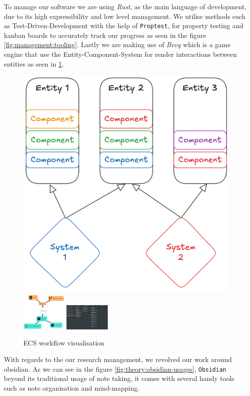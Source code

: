 To manage our software we are using \textit{Rust},
as the main language of development, due to its high expressibility and low level management.
We utilise methods such as Test-Driven-Development with the help of \texttt{Proptest},
for property testing and kanban boards to accurately track our progress as seen
in the figure \ref{fig:management:tooling}. Lastly we are making use of 
\textit{Bevy} which is a game engine that use the Entity-Component-System
for render interactions between entities as seen in \ref{fig:soft:ecs-workflow}.


\begin{figure}[h!]
    \centering
    \includegraphics[width=0.2\linewidth]{assets/ECS-visualisatoin.png}
    \includegraphics[width=0.2\textwidth]{assets/research-visualisation.png}
    \includegraphics[width=0.2\textwidth]{assets/kanban-board.png}
    \caption{ECS workflow visualisation}
    \label{fig:soft:ecs-workflow}
\end{figure}

With regards to the our research management, we revolved our work around obsidian. As we can see in the figure \ref{fig:theory:obsidian-usages}, 
\texttt{Obsidian} beyond its traditional usage of note taking, it comes
with several handy tools such as note organisation and mind-mapping.



